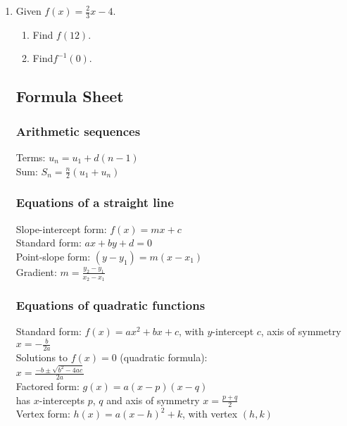 \documentclass[12pt, twoside]{article}
\begin{document}
\begin{enumerate}
\item Given $\displaystyle f(x)=\frac{2}{3}x-4$.
\begin{multicols*}{2}
    \begin{enumerate}
        \item Find $f(12)$. \vspace{2cm}
        \item Find$f^{-1}(0)$.
    \end{enumerate}
\end{multicols*}


\newpage
\subsection*{Formula Sheet}
\subsubsection*{Arithmetic sequences}
Terms: $u_n=u_1 + d(n-1)$\\[0.25cm]
Sum: $\displaystyle S_n= \frac{n}{2}(u_1 + u_n)$

\subsubsection*{Equations of a straight line} 
Slope-intercept form: $f(x)=mx+c$\\[0.25cm]
Standard form: $ax+by+d=0$\\[0.25cm]
Point-slope form: $(y-y_1)=m(x-x_1)$\\[0.25cm]
Gradient: $\displaystyle m=\frac{y_2-y_1}{x_2-x_1}$

\subsubsection*{Equations of quadratic functions}
Standard form: $f(x)=ax^2 + bx+c$, with $y$-intercept $c$, axis of symmetry $\displaystyle x=-\frac{b}{2a}$\\[0.25cm]
Solutions to $f(x)=0$ (quadratic formula): \\[0.25cm]
$\displaystyle x=\frac{-b \pm \sqrt{b^2-4ac}}{2a}$\\[0.25cm]
Factored form: $g(x)=a(x-p)(x-q)$ \\[0.25cm]
has $x$-intercepts $p$, $q$ and axis of symmetry $\displaystyle x=\frac{p+q}{2}$\\[0.25cm] 
Vertex form: $h(x)=a(x-h)^2+k$, with vertex $(h,k)$


\end{enumerate}
\end{document}
